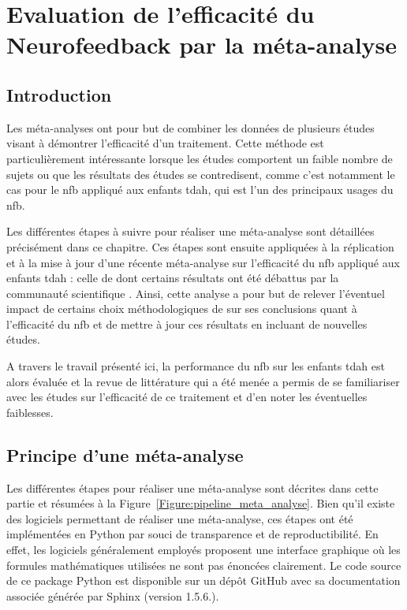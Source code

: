 \chapter{Evaluation de l'efficacité du Neurofeedback par la méta-analyse} \label{chapitre-2}

\section*{Introduction}
Les méta-analyses ont pour but de combiner les données de plusieurs études visant à démontrer l'efficacité d'un traitement. Cette méthode est
particulièrement intéressante lorsque les études comportent un faible nombre de sujets ou que les résultats des études se contredisent, 
comme c'est notamment le cas pour le \gls{nfb} appliqué aux enfants \gls{tdah}, qui est l'un des principaux usages du \gls{nfb}. 

Les différentes étapes à suivre pour réaliser une méta-analyse sont détaillées précisément dans ce chapitre.
Ces étapes sont ensuite appliquées à la réplication et à la mise à jour d'une récente méta-analyse sur l'efficacité du \gls{nfb} appliqué aux enfants \gls{tdah} :
celle de \citet{Cortese2016} dont certains résultats ont été débattus par la communauté scientifique \citep{Micoulaud2016}. Ainsi, cette analyse a pour but
de relever l'éventuel impact de certains choix méthodologiques de \citet{Cortese2016} sur ses conclusions quant à l'efficacité du \gls{nfb} et de mettre à jour
ces résultats en incluant de nouvelles études. 

A travers le travail présenté ici, la performance du \gls{nfb} sur les enfants \gls{tdah} est alors évaluée et la revue de littérature
qui a été menée a permis de se familiariser avec les études sur l'efficacité de ce traitement et d'en noter les éventuelles faiblesses.

\clearpage

\section{Principe d'une méta-analyse} \label{methods}

Les différentes étapes pour réaliser une méta-analyse sont décrites dans cette partie et résumées à la Figure~\ref{Figure:pipeline_meta_analyse}. 
Bien qu'il existe des logiciels permettant de réaliser une méta-analyse, ces étapes ont été implémentées en Python par souci de transparence et de reproductibilité. 
En effet, les logiciels généralement employés proposent une interface graphique où les formules mathématiques utilisées ne sont pas énoncées clairement. Le code source de ce package 
Python est disponible sur un dépôt GitHub \citep{Bussalb2019clinical} avec sa documentation associée générée par Sphinx (version 1.5.6.).

